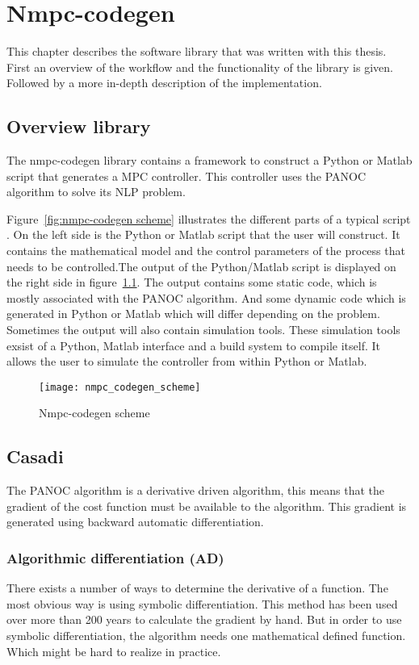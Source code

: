 \chapter{Nmpc-codegen}
This chapter describes the software library that was written with this thesis. First an overview of the workflow and the functionality of the library is given. Followed by a more in-depth description of the implementation.
\section{Overview library}
The nmpc-codegen library contains a framework to construct a Python or Matlab script that generates a MPC controller. This controller uses the PANOC algorithm to solve its NLP problem.

Figure~\eqref{fig:nmpc-codegen scheme} illustrates the different parts of a typical script . On the left side is the Python or Matlab script that the user will construct. It contains the mathematical model and the control parameters of the process that needs to be controlled.The output of the Python/Matlab script is displayed on the right side in figure~\ref{fig:nmpc-codegen scheme}. The output contains some static code, which is mostly associated with the PANOC algorithm. And some dynamic code which is generated in Python or Matlab which will differ depending on the problem. Sometimes the output will also contain simulation tools. These simulation tools exsist of a Python, Matlab interface and a build system to compile itself. It allows the user to simulate the controller from within Python or Matlab.
	\begin{figure}[H]
		\centering
		\texttt{[image: nmpc\_codegen\_scheme]}
		\caption{Nmpc-codegen scheme}
		\label{fig:nmpc-codegen scheme}
	\end{figure}

\section{Casadi}
The PANOC algorithm is a derivative driven algorithm, this means that the gradient of the cost function must be available to the algorithm. This gradient is generated using backward automatic differentiation.

\subsection{Algorithmic differentiation (AD)}
There exists a number of ways to determine the derivative of a function. The most obvious way is using symbolic differentiation. This method has been used over more than 200 years to calculate the gradient by hand. But in order to use symbolic differentiation, the algorithm needs one mathematical defined function. Which might be hard to realize in practice.

